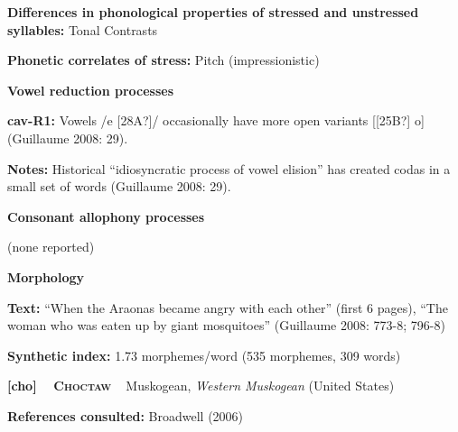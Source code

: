 \begin{styleBody}
\textbf{Differences in phonological properties of stressed and unstressed syllables:} Tonal Contrasts
\end{styleBody}

\begin{styleBody}
\textbf{Phonetic correlates of stress: }Pitch (impressionistic)
\end{styleBody}

\begin{styleBody}
\textbf{Vowel reduction processes}
\end{styleBody}

\begin{styleBody}
\textbf{cav-R1: }Vowels /e [28A?]/ occasionally have more open variants [[25B?] o] (Guillaume 2008: 29).
\end{styleBody}

\begin{styleBody}
\textbf{Notes: }Historical “idiosyncratic process of vowel elision” has created codas in a small set of words (Guillaume 2008: 29).
\end{styleBody}

\begin{styleBody}
\textbf{Consonant allophony processes}
\end{styleBody}

\begin{styleBody}
(none reported)
\end{styleBody}

\begin{styleBody}
\textbf{Morphology}
\end{styleBody}

\begin{styleBody}
\textbf{Text:} “When the Araonas became angry with each other” (first 6 pages), “The woman who was eaten up by giant mosquitoes” (Guillaume 2008: 773-8; 796-8)
\end{styleBody}

\begin{styleBody}
\textbf{Synthetic index: }1.73 morphemes/word (535 morphemes, 309 words)
\end{styleBody}

\clearpage\begin{styleBody}
\textbf{[cho] }\ \ \textbf{\textsc{Choctaw}}\textbf{\ \ }Muskogean, \textit{Western Muskogean} (United States)
\end{styleBody}

\begin{styleBody}
\textbf{References consulted: }Broadwell (2006)
\end{styleBody}

